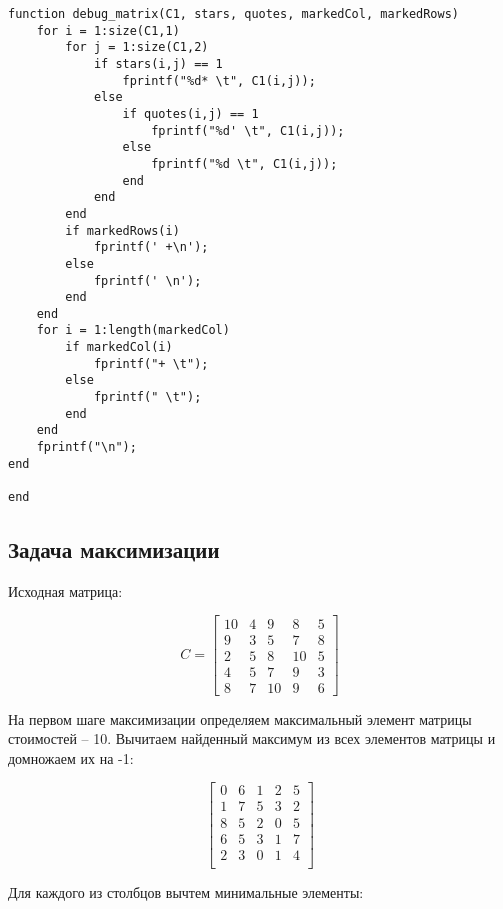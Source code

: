 \documentclass[a4paper,14pt]{article}
\begin{document}
\begin{lstlisting}[label=some-code,caption=Листинг программы]
% Функция вывода матрицы с 0*, 0'
function debug_matrix(C1, stars, quotes, markedCol, markedRows)
    for i = 1:size(C1,1)
        for j = 1:size(C1,2)
            if stars(i,j) == 1
                fprintf("%d* \t", C1(i,j));
            else
                if quotes(i,j) == 1
                    fprintf("%d' \t", C1(i,j));
                else
                    fprintf("%d \t", C1(i,j));
                end
            end
        end
        if markedRows(i)
            fprintf(' +\n');
        else
            fprintf(' \n');
        end 
    end
    for i = 1:length(markedCol)
        if markedCol(i)
            fprintf("+ \t");
        else
            fprintf(" \t");
        end
    end
    fprintf("\n");
end

end
\end{lstlisting}

\subsection{Задача максимизации}

Исходная матрица:

\begin{equation} C=
\begin{bmatrix}
10 & 4 & 9 & 8 & 5\\
9 & 3 & 5 & 7 & 8\\
2 & 5 & 8 & 10 & 5\\
4 & 5 & 7 & 9 & 3\\
8 & 7 & 10 & 9 & 6
\end{bmatrix}
\end{equation}

На первом шаге максимизации определяем максимальный элемент матрицы стоимостей -- 10. Вычитаем найденный максимум из всех элементов матрицы и домножаем их на -1:

\begin{equation}
\begin{bmatrix}
     0  &   6  &   1  &   2  &   5\\
     1  &   7  &   5  &   3  &   2\\
     8  &   5  &   2  &   0  &   5\\
     6  &   5  &   3  &   1  &   7\\
     2  &   3  &   0  &   1  &   4\\
\end{bmatrix}
\end{equation}

Для каждого из столбцов вычтем минимальные элементы:
\end{document}
